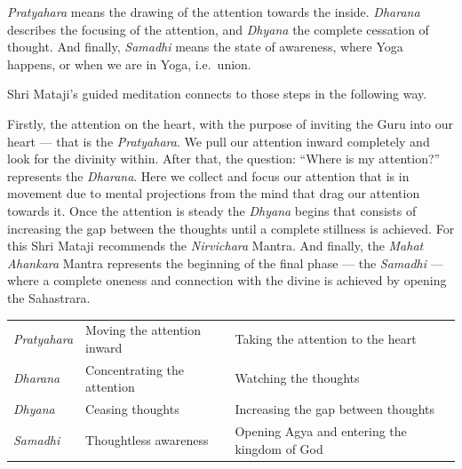 \documentclass[12pt]{article}
\begin{document}
\textit{Pratyahara} means the drawing of the attention towards the inside.
\textit{Dharana} describes the focusing of the attention, and \textit{Dhyana} the complete cessation of thought.
And finally, \textit{Samadhi} means the state of awareness, where Yoga happens, or when we are in Yoga, i.e.\ union.


Shri Mataji's guided meditation connects to those steps in the following way.

Firstly, the attention on the heart, with the purpose of inviting the Guru into our heart --- that is the \textit{Pratyahara}.
We pull our attention inward completely and look for the divinity within.
After that, the question: ``Where is my attention?'' represents the \textit{Dharana}.
Here we collect and focus our attention that is in movement due to mental projections from the mind that drag our attention towards it.
Once the attention is steady the \textit{Dhyana} begins that consists of increasing the gap between the thoughts until a complete stillness is achieved.
For this Shri Mataji recommends the \textit{Nirvichara} Mantra.
And finally, the \textit{Mahat Ahankara} Mantra represents the beginning of the final phase --- the \textit{Samadhi} --- where a complete oneness and connection with the divine is achieved by opening the Sahastrara.

%
\begin{tabular}{lll}
\textit{Pratyahara} & Moving the attention inward  & Taking the attention to the heart           \\
\textit{Dharana}    & Concentrating the attention  & Watching the thoughts                       \\
\textit{Dhyana}     & Ceasing thoughts             & Increasing the gap between thoughts         \\
\textit{Samadhi}    & Thoughtless awareness        & Opening Agya and entering the kingdom of God \\
\end{tabular}
\end{document}
